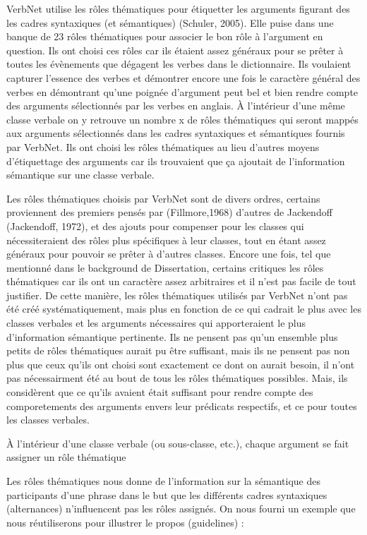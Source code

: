 VerbNet utilise les rôles thématiques pour étiquetter les arguments figurant des les cadres syntaxiques (et sémantiques) (Schuler, 2005). Elle puise dans une banque de 23 rôles thématiques pour associer le bon rôle à l'argument en question. Ils ont choisi ces rôles car ils étaient assez généraux pour se prêter à toutes les évènements que dégagent les verbes dans le dictionnaire. Ils voulaient capturer l'essence des verbes et démontrer encore une fois le caractère général des verbes en démontrant qu'une poignée d'argument peut bel et bien rendre compte des arguments sélectionnés par les verbes en anglais. À l'intérieur d'une même classe verbale on y retrouve un nombre x de rôles thématiques qui seront mappés aux arguments sélectionnés dans les cadres syntaxiques et sémantiques fournis par VerbNet. Ils ont choisi les rôles thématiques au lieu d'autres moyens d'étiquettage des arguments car ils trouvaient que ça ajoutait de l'information sémantique sur une classe verbale. 

Les rôles thématiques choisis par VerbNet sont de divers ordres, certains proviennent des premiers pensés par (Fillmore,1968) d'autres de Jackendoff (Jackendoff, 1972), et des ajouts pour compenser pour les classes qui nécessiteraient des rôles plus spécifiques à leur classes, tout en étant assez généraux pour pouvoir se prêter à d'autres classes. Encore une fois, tel que mentionné dans le background de Dissertation, certains critiques les rôles thématiques car ils ont un caractère assez arbitraires et il n'est pas facile de tout justifier. De cette manière, les rôles thématiques utilisés par VerbNet n'ont pas été créé systématiquement, mais plus en fonction de ce qui cadrait le plus avec les classes verbales et les arguments nécessaires qui apporteraient le plus d'information sémantique pertinente. Ils ne pensent pas qu'un ensemble plus petits de rôles thématiques aurait pu être suffisant, mais ils ne pensent pas non plus que ceux qu'ils ont choisi sont exactement ce dont on aurait besoin, il n'ont pas nécessairment été au bout de tous les rôles thématiques possibles. Mais, ils considèrent que ce qu'ils avaient était suffisant pour rendre compte des comporetements des arguments envers leur prédicats respectifs, et ce pour toutes les classes verbales.

À l'intérieur d'une classe verbale (ou sous-classe, etc.), chaque argument se fait assigner un rôle thématique

Les rôles thématiques nous donne de l'information sur la sémantique des participants d'une phrase dans le but que les différents cadres syntaxiques (alternances) n'influencent pas les rôles assignés. On nous fourni un exemple que nous réutiliserons pour illustrer le propos (guidelines) :

